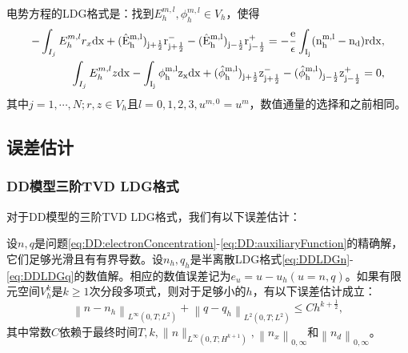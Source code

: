 电势方程的LDG格式是：找到$E_h^{m,l},\phi_h^{m,l} \in V_h$，使得
\begin{align}
    -\int_{I_j} E_h^{m,l}r_x \rm{d}x + (\hat{E}_h^{m,l})_{j+\frac{1}{2}}r_{j+\frac{1}{2}}^- - (\hat{E}_h^{m,l})_{j-\frac{1}{2}}r_{j-\frac{1}{2}}^+ = -\frac{e}{\epsilon}\int_{I_j}(n_h^{m,l} - n_d) r\rm{d} x, \label{eq:IMEX:poisson:LDG:1} \\
    \int_{I_j} E_h^{m,l}z \rm{d}x - \int_{I_j} \phi_h^{m,l}z_x \rm{d}x  + (\hat{\phi}_h^{m,l})_{j+\frac{1}{2}}z^-_{j+\frac{1}{2}} - (\hat{\phi}_h^{m,l})_{j-\frac{1}{2}}z_{j-\frac{1}{2}}^+  = 0,\label{eq:IMEX:poisson:LDG:2}
\end{align}
其中$j = 1,\cdots,N; r,z \in V_h$且$l = 0,1,2,3, u^{m,0} = u^m$，数值通量的选择和之前相同。

\subsection{误差估计}
\subsubsection{DD模型三阶TVD LDG格式}
对于DD模型的三阶TVD LDG格式，我们有以下误差估计\cite{liu2010error}：
\begin{theorem}
    设$n, q$是问题\eqref{eq:DD:electronConcentration}-\eqref{eq:DD:auxiliaryFunction}的精确解，它们足够光滑且有有界导数。设$n_h, q_h$是半离散LDG格式\eqref{eq:DDLDGn}-\eqref{eq:DDLDGq}的数值解。相应的数值误差记为$e_{u}=u-u_{h}(u=n, q)$。如果有限元空间$V_{h}^{k}$是$k \geq 1$次分段多项式，则对于足够小的$h$，有以下误差估计成立：
    \begin{equation}
        \left\|n-n_h\right\|_{L^{\infty}\left(0, T ; L^{2}\right)}+\left\|q-q_h\right\|_{L^{2}\left(0, T ; L^{2}\right)} \leq C h^{k+\frac{1}{2}},
    \end{equation}
    其中常数$C$依赖于最终时间$T,k, \|n\|_{L^{\infty}\left(0, T ; H^{k+1}\right)}, \left\|n_{x}\right\|_{0, \infty}$和$\left\|n_{d}\right\|_{0, \infty}$。
\end{theorem}


